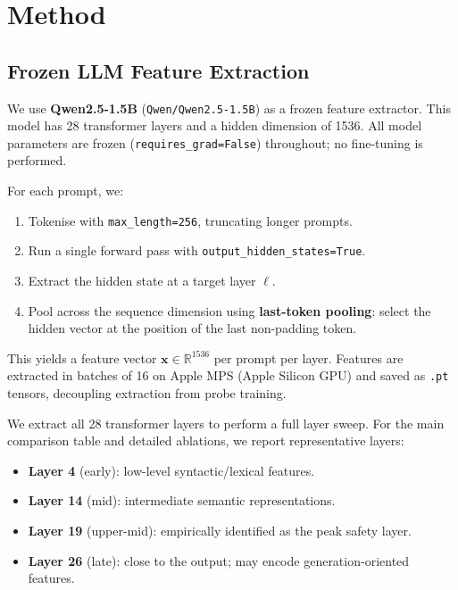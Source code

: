 \documentclass[11pt,a4paper]{article}
\begin{document}
\section{Method}
\label{sec:method}

\subsection{Frozen LLM Feature Extraction}

We use \textbf{Qwen2.5-1.5B} (\texttt{Qwen/Qwen2.5-1.5B}) as a frozen feature
extractor. This model has 28 transformer layers and a hidden dimension of 1536.
All model parameters are frozen (\texttt{requires\_grad=False}) throughout; no
fine-tuning is performed.

For each prompt, we:
\begin{enumerate}[noitemsep]
  \item Tokenise with \texttt{max\_length=256}, truncating longer prompts.
  \item Run a single forward pass with \texttt{output\_hidden\_states=True}.
  \item Extract the hidden state at a target layer $\ell$.
  \item Pool across the sequence dimension using \textbf{last-token pooling}:
        select the hidden vector at the position of the last non-padding token.
\end{enumerate}

This yields a feature vector $\mathbf{x} \in \mathbb{R}^{1536}$ per prompt per layer.
Features are extracted in batches of 16 on Apple MPS (Apple Silicon GPU) and saved
as \texttt{.pt} tensors, decoupling extraction from probe training.

We extract all 28 transformer layers to perform a full layer sweep. For the main
comparison table and detailed ablations, we report representative layers:
\begin{itemize}[noitemsep]
  \item \textbf{Layer 4} (early): low-level syntactic/lexical features.
  \item \textbf{Layer 14} (mid): intermediate semantic representations.
  \item \textbf{Layer 19} (upper-mid): empirically identified as the peak safety layer.
  \item \textbf{Layer 26} (late): close to the output; may encode generation-oriented features.
\end{itemize}
\end{document}
